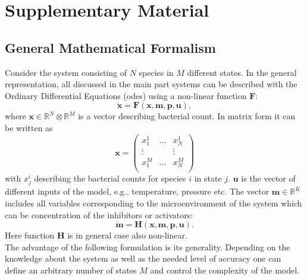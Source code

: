 \documentclass[10pt,twocolumn,5p]{elsarticle}
\numberwithin{equation}{section}
\newcommand{\beginsupplement}{%
  \renewcommand{\thesection}{}
  \setcounter{subsection}{0}
  \renewcommand{\thesubsection}{S\arabic{subsection}}
  \setcounter{table}{0}
  \renewcommand{\thetable}{S\arabic{table}}%
  \setcounter{figure}{0}
  \renewcommand{\thefigure}{S\arabic{figure}}%
  \setcounter{listing}{0}
  \renewcommand{\thelisting}{S\arabic{listing}}
}
\newcommand{\mbx}{\mathbf{x}}
\newcommand{\mbm}{\mathbf{m}}
\newcommand{\mbp}{\mathbf{p}}
\newcommand{\mbu}{\mathbf{u}}
\newcommand{\mbF}{\mathbf{F}}
\newcommand{\mbH}{\mathbf{H}}
\begin{document}


\newpage
\beginsupplement
\section{Supplementary Material}
\subsection{General Mathematical Formalism}  \label{ssec:supplement1}
Consider the system consisting of $N$ species in $M$ different states.
In the general representation, all discussed in the main part systems  can be described with the Ordinary Differential Equations (\acp{ode}) using a non-linear function $\mbF$:
\begin{equation}
   \dot{\mbx} = \mbF(\mbx, \mbm, \mbp, \mbu),
\label{eq:model_ODE_x}
\end{equation}
where  $\mbx \in \mathbb{R}^{N}  \otimes \mathbb{R}^{M}$ is a vector describing bacterial count.
In matrix form it can be written as
\begin{equation}
    \mbx = \begin{pmatrix}
        x^1_1  & \dots & x^1_N  \\
        \vdots &       & \vdots \\
        x^M_1  & \dots & x^M_N  \\
            \end{pmatrix}
    \label{eq:model_bact}
\end{equation}
with $x_{j}^{i}$ describing the bacterial counts for species $i$ in state $j$.
$\mbu$ is the vector of different inputs of the model, e.g., temperature, pressure etc.
The vector $\mbm \in \mathbb{R}^{K}$ includes all variables corresponding to the microenvironment of the system which can be concentration of the inhibitors or activators:
\begin{equation}
    \dot{\mbm} = \mbH (\mbx, \mbm, \mbp, \mbu).
    \label{eq:model_microenv}
\end{equation}
Here function $\mbH$ is in general case also non-linear.\\
%
The advantage of the following formulation is its generality.
Depending on the knowledge about the system as well as the needed level of accuracy one can define an arbitrary number of states $M$ and control the complexity of the model.
\end{document}
